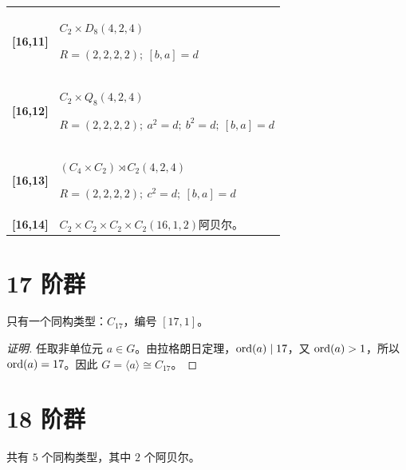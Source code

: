 \documentclass[UTF8,fontset=fandol,11pt,a4paper]{ctexart}
\begin{document}
\begin{longtable}{@{}p{17mm}>{\raggedright\arraybackslash}p{141mm}@{}}
\textbf{[16,11]} & $C_{2}\times D_{8}$\quad $(4,2,4)$\par\(R=(2,2,2,2);\allowbreak\ [b,a]=d\)\\[3pt]

\textbf{[16,12]} & $C_{2}\times Q_{8}$\quad $(4,2,4)$\par\(R=(2,2,2,2);\allowbreak\ a^{2}=d;\allowbreak\ b^{2}=d;\allowbreak\ [b,a]=d\)\\[3pt]

\textbf{[16,13]} & $(C_{4}\times C_{2})\rtimes C_{2}$\quad $(4,2,4)$\par\(R=(2,2,2,2);\allowbreak\ c^{2}=d;\allowbreak\ [b,a]=d\)\\[3pt]

\textbf{[16,14]} & $C_{2}\times C_{2}\times C_{2}\times C_{2}$\quad $(16,1,2)$\quad 阿贝尔。\\[3pt]

\end{longtable}\endgroup

\section*{17 阶群}\label{order:17}

只有一个同构类型：$C_{17}$，编号 $[17,1]$。

\begin{proof}[证明]
任取非单位元 $a\in G$。由拉格朗日定理，$\operatorname{ord}(a)\mid 17$，又 $\operatorname{ord}(a)>1$，所以 $\operatorname{ord}(a)=17$。因此 $G=\langle a\rangle\cong C_{17}$。
\end{proof}

\section*{18 阶群}\label{order:18}

共有 $5$ 个同构类型，其中 $2$ 个阿贝尔。

\begingroup\small\setlength{\tabcolsep}{3pt}\renewcommand{\arraystretch}{1.12}
\end{document}

